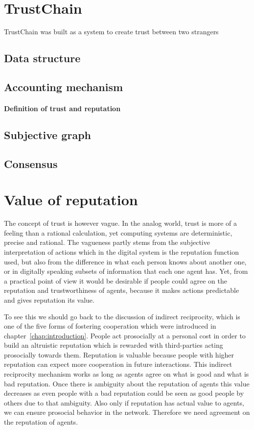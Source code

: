 \section{TrustChain}
TrustChain was built as a system to create trust between two strangers

\subsection{Data structure}
\subsection{Accounting mechanism}
\paragraph{Definition of trust and reputation}
\subsection{Subjective graph}
\subsection{Consensus}


\section{Value of reputation}
The concept of trust is however vague. In the analog world, trust is more of a feeling than a 
rational calculation, yet computing systems are deterministic, precise and rational. The vagueness 
partly stems from the subjective interpretation of actions which in the digital system is the 
reputation function used, but also from the difference in what each person knows about another one,
or in digitally speaking subsets of information that each one agent has. 
Yet, from a practical point of view it would be desirable if people could agree on the reputation 
and trustworthiness of agents, because it makes actions predictable and gives reputation its value. 

To see this we should go back to the discussion of indirect reciprocity, which is one of the five
forms of fostering cooperation which were introduced in chapter~\ref{chap:introduction}. People act
prosocially at a personal cost in order to build an altruistic reputation which is rewarded with 
third-parties acting prosocially towards them. Reputation is valuable because people with higher 
reputation can expect more cooperation in future interactions. This indirect reciprocity mechanism 
works as long as agents agree on what is good and what is bad reputation. Once there is ambiguity 
about the reputation of agents this value decreases as even people with a bad reputation could be 
seen as good people by others due to that ambiguity. Also only if reputation has actual value to 
agents, we can ensure prosocial behavior in the network. Therefore we need agreement on the 
reputation of agents. 

